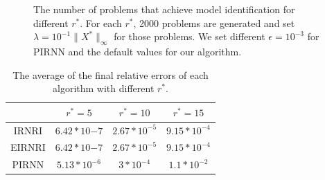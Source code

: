 \documentclass[twoside,11pt]{article}
\numberwithin{equation}{section}
\begin{document}
\begin{figure}[H]
\captionsetup{singlelinecheck=off, justification=raggedright}
\caption{The number of problems that achieve model identification for different $r^{*}$. For each $r^{*}$, 2000 problems are generated and set $\lambda = 10^{-1}\|X^{*}\|_{\infty}$ for those problems. We set different $\epsilon = 10^{-3}$ for PIRNN and the default values for our algorithm.}
\label{fig_MatrixIden}
\end{figure}

\begin{table}[htbp]
  \centering
      \begin{tabular}{cccc}
        \toprule
             & $r^* = 5$ & $r^*=10$ & $r^* = 15$ \\
        \hline
      IRNRI  & $6.42*10{-7}$   & $2.67*10^{-5}$ & $9.15*10^{-4}$   \\
      EIRNRI & $6.42*10{-7}$   & $2.67*10^{-5}$ & $9.15*10^{-4}$   \\
      PIRNN  & $5.13*10^{-6}$  & $3*10^{-4}$    & $1.1*10^{-2}$   \\
      \bottomrule
      \end{tabular}
  \captionsetup{singlelinecheck=off, justification=raggedright}
  \caption{The average of the final relative errors of each algorithm with different $r^{*}$.}
  \label{fig_MatrixIden}
  \end{table}
\end{document}
